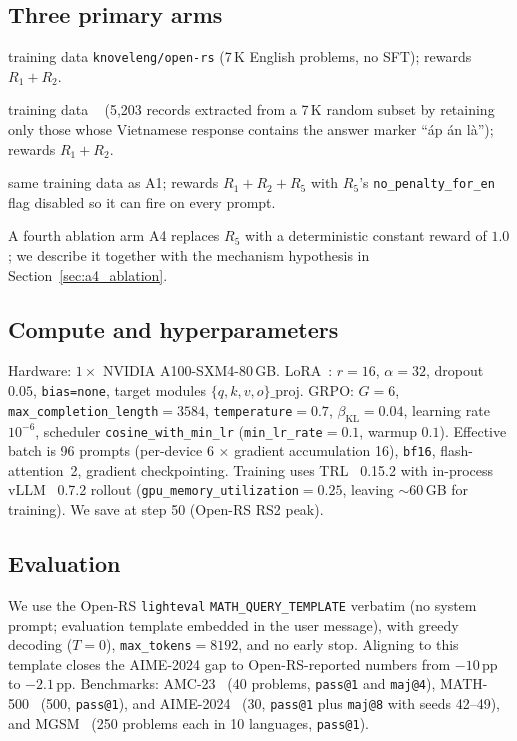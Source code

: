 \documentclass[11pt]{article}
\newcommand{\armA}{\textsc{A1}}
\newcommand{\armB}{\textsc{A2}}
\newcommand{\armC}{\textsc{A3}}
\newcommand{\armD}{\textsc{A4}}
\newcommand{\R}[1]{R_{#1}}
\begin{document}
\subsection{Three primary arms}
\begin{description}\itemsep0pt
\item[\armA{} (English-only)] training data \texttt{knoveleng/open-rs}
(7\,K English problems, no SFT); rewards $\R{1}+\R{2}$.
\item[\armB{} (Vietnamese-translated)] training data
~\cite{metamathqa_vi_2024}
(5{,}203 records
extracted from a 7\,K random subset by retaining only those whose
Vietnamese response contains the answer marker
``\DJ\'ap \'an l\`a''); rewards $\R{1}+\R{2}$.
\item[\armC{} (English with $\R{5}$)] same training data as \armA{};
rewards $\R{1}+\R{2}+\R{5}$ with $\R{5}$'s
\texttt{no\_penalty\_for\_en} flag disabled so it can fire on every
prompt.
\end{description}
A fourth ablation arm \armD{} replaces $\R{5}$ with a deterministic
constant reward of $1.0$; we describe it together with the mechanism
hypothesis in Section~\ref{sec:a4_ablation}.

\subsection{Compute and hyperparameters}
Hardware: $1\times$ NVIDIA A100-SXM4-80\,GB. LoRA~\cite{hu2022lora}: $r{=}16$, $\alpha{=}32$,
dropout~$0.05$, \texttt{bias=none}, target modules
$\{q,k,v,o\}\_\mathrm{proj}$. GRPO: $G{=}6$,
\texttt{max\_completion\_length}$=3584$, \texttt{temperature}$=0.7$,
$\beta_{\text{KL}}=0.04$, learning rate $10^{-6}$, scheduler
\texttt{cosine\_with\_min\_lr} (\texttt{min\_lr\_rate}$=0.1$,
warmup $0.1$). Effective batch is 96 prompts (per-device 6 $\times$
gradient accumulation 16), \texttt{bf16}, flash-attention~2, gradient
checkpointing. Training uses TRL~\cite{trl_2025} 0.15.2 with
in-process vLLM~\cite{kwon2023vllm} 0.7.2 rollout
(\texttt{gpu\_memory\_utilization}$=0.25$, leaving $\sim 60$\,GB for
training). We save at step 50 (Open-RS RS2 peak).

\subsection{Evaluation}
We use the Open-RS \texttt{lighteval} \texttt{MATH\_QUERY\_TEMPLATE}
verbatim (no system prompt; evaluation template embedded in the user
message), with greedy decoding ($T{=}0$), \texttt{max\_tokens}$=8192$,
and no early stop. Aligning to this template closes the AIME-2024 gap
to Open-RS-reported numbers from $-10$\,pp to $-2.1$\,pp. Benchmarks:
AMC-23~\cite{amc23_dataset} (40 problems, \texttt{pass@1} and
\texttt{maj@4}), MATH-500~\cite{lightman2024verify} (500,
\texttt{pass@1}), and AIME-2024~\cite{aime2024_dataset} (30,
\texttt{pass@1} plus \texttt{maj@8} with seeds 42--49), and
MGSM~\cite{mgsm_2022} (250 problems each in 10 languages,
\texttt{pass@1}).
\end{document}
